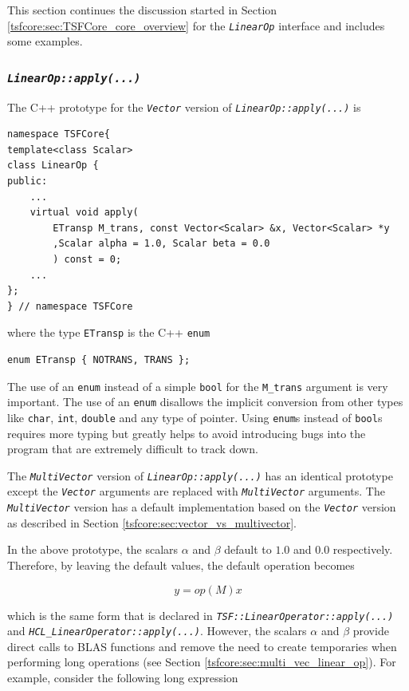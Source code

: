 \documentclass[10pt,fleqn]{article}
\begin{document}
This section continues the discussion started in Section
\ref{tsfcore:sec:TSFCore_core_overview} for the
\texttt{\textit{LinearOp}} interface and includes some examples.

%
\subsubsection{\texttt{\textit{LinearOp::apply(...)}}}
\label{tsfcore:sec:linear_op_apply}
%

The C++ prototype for the \texttt{\textit{Vector}} version of
\texttt{\textit{LinearOp\-::apply(...)}} is

{\scriptsize\begin{verbatim}
namespace TSFCore{
template<class Scalar>
class LinearOp {
public:
    ...
    virtual void apply(
        ETransp M_trans, const Vector<Scalar> &x, Vector<Scalar> *y
        ,Scalar alpha = 1.0, Scalar beta = 0.0
        ) const = 0;
    ...
};
} // namespace TSFCore
\end{verbatim}}

where the type \texttt{ETransp} is the C++ \texttt{enum}

{\scriptsize\begin{verbatim}
enum ETransp { NOTRANS, TRANS };
\end{verbatim}}

The use of an \texttt{enum} instead of a simple \texttt{bool} for the
\texttt{M\_trans} argument is very important.  The use of an \texttt{enum}
disallows the implicit conversion from other types like \texttt{char},
\texttt{int}, \texttt{double} and any type of pointer.  Using \texttt{enum}s
instead of \texttt{bool}s requires more typing but greatly helps to
avoid introducing bugs into the program that are extremely difficult
to track down.

The \texttt{\textit{MultiVector}} version of
\texttt{\textit{LinearOp\-::apply(...)}} has an identical prototype
except the \texttt{\textit{Vector}} arguments are replaced with
\texttt{\textit{MultiVector}} arguments.  The \texttt{\textit{MultiVector}}
version has a default implementation based on the
\texttt{\textit{Vector}} version as described in Section
\ref{tsfcore:sec:vector_vs_multivector}.

In the above prototype, the scalars $\alpha$ and $\beta$ default to
$1.0$ and $0.0$ respectively.  Therefore, by leaving the default values,
the default operation becomes

\[
y = op(M) x
\]

which is the same form that is declared in
\texttt{\textit{TSF::LinearOperator::apply(...)}}  and
\texttt{\textit{HCL\_LinearOperator::apply(...)}}.  However, the scalars
$\alpha$ and $\beta$ provide direct calls to BLAS functions and remove
the need to create temporaries when performing long operations (see
Section \ref{tsfcore:sec:multi_vec_linear_op}).  For example, consider
the following long expression
\end{document}
